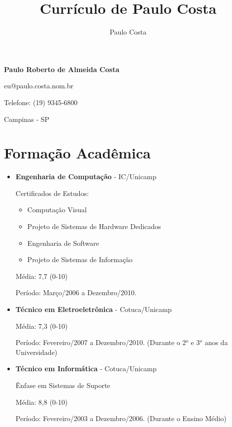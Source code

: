 \documentclass[a4paper,10pt]{article}
\title{Currículo de Paulo Costa}
\author{Paulo Costa}
\begin{document}
  
  \LARGE\textbf{Paulo Roberto de Almeida Costa}

  \large eu@paulo.costa.nom.br

  \large Telefone: (19) 9345-6800

  \large Campinas - SP %

  \normalsize 
  \section{Formação Acadêmica}
    \begin{itemize}
      \item  
        \textbf{Engenharia de Computação} - IC/Unicamp

        Certificados de Estudos:
        \begin{itemize}
          \item Computação Visual
          \item Projeto de Sistemas de Hardware Dedicados
          \item Engenharia de Software
          \item Projeto de Sistemas de Informação
        \end{itemize}

        Média: 7,7 (0-10)

        Período: Março/2006 a Dezembro/2010.

% 

      \item  
        \textbf{Técnico em Eletroeletrônica} - Cotuca/Unicamp

        Média: 7,3  (0-10)

        Período: Fevereiro/2007 a Dezembro/2010. {\small(Durante o 2$^{o}$ e 3$^{o}$ anos da Universidade)}

      \item  
        \textbf{Técnico em Informática} - Cotuca/Unicamp

        Ênfase em Sistemas de Suporte

        Média: 8,8  (0-10)

        Período: Fevereiro/2003 a Dezembro/2006. {\small(Durante o Ensino Médio)}

    \end{itemize}
\end{document}
